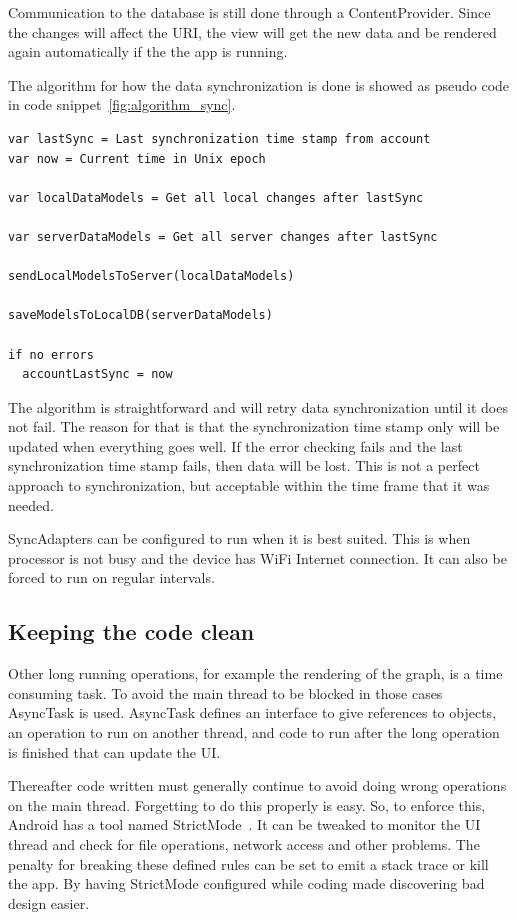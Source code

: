 Communication to the database is still done through a ContentProvider. Since the changes will affect the URI, the view will get the new data and be rendered again automatically if the the app is running. 

The algorithm for how the data synchronization is done is showed as pseudo code in code snippet~\ref{fig:algorithm_sync}.


\noindent\begin{minipage}{\textwidth}
\begin{lstlisting}[caption={Algorithm for the synchronization flow.}, label={fig:algorithm_sync}]
var lastSync = Last synchronization time stamp from account
var now = Current time in Unix epoch

var localDataModels = Get all local changes after lastSync

var serverDataModels = Get all server changes after lastSync

sendLocalModelsToServer(localDataModels)

saveModelsToLocalDB(serverDataModels)

if no errors
  accountLastSync = now
\end{lstlisting}
\end{minipage}

The algorithm is straightforward and will retry data synchronization until it does not fail. The reason for that is that the synchronization time stamp only will be updated when everything goes well. If the error checking fails and the last synchronization time stamp fails, then data will be lost. 
This is not a perfect approach to synchronization, but acceptable within the time frame that it was needed. 

SyncAdapters can be configured to run when it is best suited. This is when processor is not busy and the device has WiFi Internet connection. It can also be forced to run on regular intervals.

\subsection{Keeping the code clean}

Other long running operations, for example the rendering of the graph, is a time consuming task. To avoid the main thread to be blocked in those cases AsyncTask is used. AsyncTask defines an interface to give references to objects, an operation to run on another thread, and code to run after the long operation is finished that can update the UI. 

Thereafter code written must generally continue to avoid doing wrong operations on the main thread. Forgetting to do this properly is easy. So, to enforce this, Android has a tool named StrictMode~\cite{androidStrictMode}. It can be tweaked to monitor the UI thread and check for file operations, network access and other problems. The penalty for breaking these defined rules can be set to emit a stack trace or kill the app. By having StrictMode configured while coding made discovering bad design easier. 

